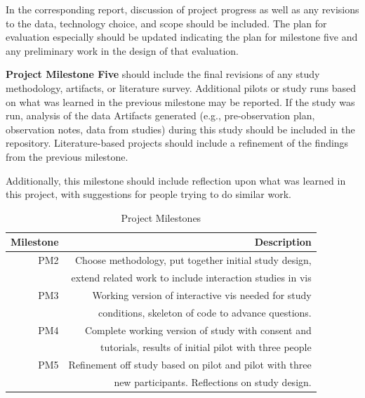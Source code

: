 In the corresponding report, discussion of project progress as well as any
revisions to the data, technology choice, and scope should be included. The
plan for evaluation especially should be updated indicating the plan for
milestone five and any preliminary work in the design of that evaluation.


\vspace{1.5ex}\noindent\textbf{Project Milestone Five} should include the
final revisions of any study methodology, artifacts, or literature survey.
Additional pilots or study runs based on what was learned in the previous
milestone may be reported. If the study was run, analysis of the data
Artifacts generated (e.g., pre-observation plan, observation notes, data from
studies) during this study should be included in the repository.
Literature-based projects should include a refinement of the findings from the
previous milestone.

Additionally, this milestone should include reflection upon what was learned
in this project, with suggestions for people trying to do similar work.


\begin{table}[h]
 \caption{Project Milestones}\vspace{1ex} %
 \label{tab:milestones}
 \scriptsize
 \centering %
   \begin{tabular}{r|r}
     Milestone & Description\\
   \hline
     PM2 & Choose methodology, put together initial study design, \\
	 & extend related work to include interaction studies in vis\\
     PM3 & Working version of interactive vis needed for study  \\
         & conditions, skeleton of code to advance questions. \\
     PM4 & Complete working version of study with consent and\\
         & tutorials, results of initial pilot with three people \\
     PM5 & Refinement off study based on pilot and pilot with three\\
         & new participants. Reflections on study design.\\
   \end{tabular}
\end{table}

